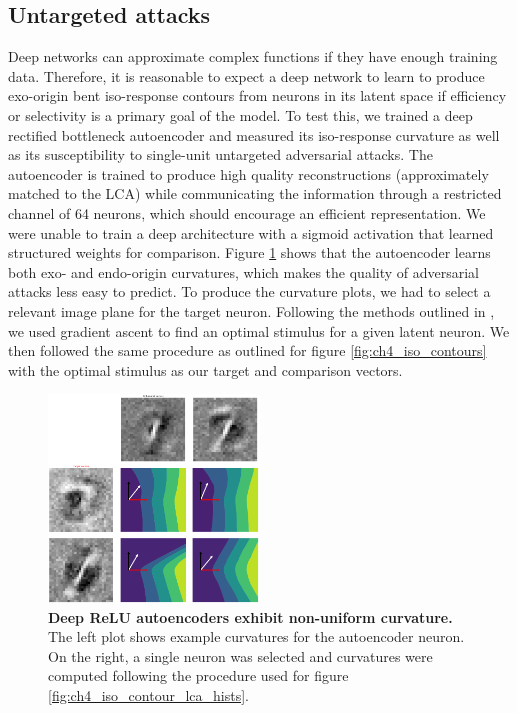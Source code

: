 \subsection{Untargeted attacks}\label{sec:ch4_deep_relu_comparisons}
Deep networks can approximate complex functions if they have enough training data. Therefore, it is reasonable to expect a deep network to learn to produce exo-origin bent iso-response contours from neurons in its latent space if efficiency or selectivity is a primary goal of the model. To test this, we trained a deep rectified bottleneck autoencoder and measured its iso-response curvature as well as its susceptibility to single-unit untargeted adversarial attacks. The autoencoder is trained to produce high quality reconstructions (approximately matched to the LCA) while communicating the information through a restricted channel of 64 neurons, which should encourage an efficient representation. We were unable to train a deep architecture with a sigmoid activation that learned structured weights for comparison. Figure \ref{fig:ch4_drae_curvature} shows that the autoencoder learns both exo- and endo-origin curvatures, which makes the quality of adversarial attacks less easy to predict. To produce the curvature plots, we had to select a relevant image plane for the target neuron. Following the methods outlined in \parencite{mahendran2016visualizing}, we used gradient ascent to find an optimal stimulus for a given latent neuron. We then followed the same procedure as outlined for figure \ref{fig:ch4_iso_contours} with the optimal stimulus as our target and comparison vectors.

\begin{figure}
    \centering
    \includegraphics[width=0.5\textwidth]{figures/drae_deep_curvature.png}
    \caption{\textbf{Deep ReLU autoencoders exhibit non-uniform curvature.} The left plot shows example curvatures for the autoencoder neuron. On the right, a single neuron was selected and curvatures were computed following the procedure used for figure \ref{fig:ch4_iso_contour_lca_hists}.}
    \label{fig:ch4_drae_curvature}
\end{figure}


